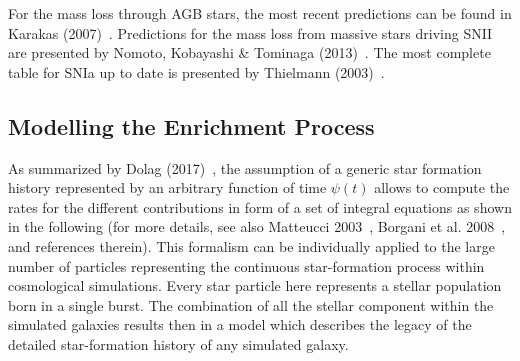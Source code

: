 \documentclass[galaxies,letter,accept,moreauthors,pdftex,10pt,a4paper,usenatbib]{mdpi}
\begin{document}
For the mass loss through AGB stars, the most recent predictions can
be found in Karakas (2007)~\cite{2007PASA...24..103K}.  Predictions
for the mass loss from massive stars driving SNII are presented by
Nomoto, Kobayashi \& Tominaga (2013)~\cite{2013ARA&A..51..457N}.  The
most complete table for SNIa up to date is presented by Thielmann
(2003)~\cite{2003fthp.conf..331T}.

\subsection{Modelling the Enrichment Process}
As summarized by Dolag (2017)~\cite{Dolag2017}, the assumption of a
generic star formation history represented by an arbitrary function
 of time $\psi(t)$ allows to compute the rates for the different
contributions in form of a set of integral equations as shown
in the following (for more details, see also Matteucci 2003~\cite{Matteucci2003}, Borgani et
al. 2008~\cite{Borgani2008}, and references therein).
This formalism can be individually applied to the large number of particles
representing the continuous star-formation process within cosmological
simulations. Every star particle here represents a stellar population
born in a single burst. The combination of all the stellar component within
the simulated galaxies results then in a model which describes
the legacy of the detailed star-formation history of any simulated galaxy.  
 
\end{document}
